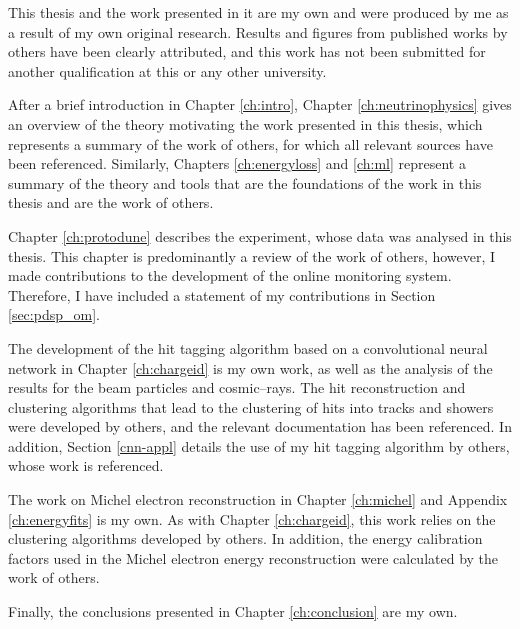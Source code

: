 This thesis and the work presented in it are my own and were produced by me as a
result of my own original research. Results and figures from published works by
others have been clearly attributed, and this work has not been submitted for
another qualification at this or any other university.

After a brief introduction in Chapter \ref{ch:intro}, Chapter 
\ref{ch:neutrinophysics} gives an overview of the theory motivating the work 
presented in this thesis, which represents a summary of the work of others, for
which all relevant sources have been referenced. Similarly, Chapters
\ref{ch:energyloss} and \ref{ch:ml} represent a summary of the theory and tools
that are the foundations of the work in this thesis and are the work of 
others. 

Chapter \ref{ch:protodune} describes the \protodune{} experiment, whose data was
analysed in this thesis. This chapter is predominantly a review of the work of
others, however, I made contributions to the development of the online 
monitoring system. Therefore, I have included a statement of my contributions 
in Section \ref{sec:pdsp_om}.

The development of the hit tagging algorithm based on a convolutional neural 
network in Chapter \ref{ch:chargeid} is my own work, as well as the analysis 
of the results for the \protodune{} beam particles and cosmic--rays. The hit 
reconstruction and clustering algorithms that lead to the clustering of hits 
into tracks and showers were developed by others, and the relevant 
documentation has been referenced. In addition, Section \ref{cnn-appl} details 
the use of my hit tagging algorithm by others, whose work is referenced.

The work on Michel electron reconstruction in Chapter \ref{ch:michel} and 
Appendix \ref{ch:energyfits} is my own. As with Chapter \ref{ch:chargeid}, this
work relies on the clustering algorithms developed by others. In addition, the 
energy calibration factors used in the Michel electron energy reconstruction
were calculated by the work of others.

Finally, the conclusions presented in Chapter \ref{ch:conclusion} are my own.
